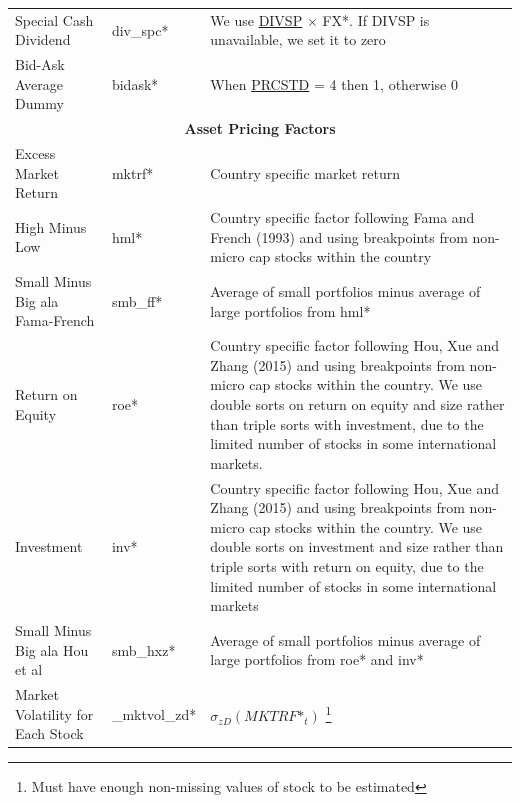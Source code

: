 \documentclass[12pt,title,fleqn]{article}
\begin{document}
{\begin{longtable}{@{\extracolsep{\fill}}|m{5cm}|l|m{8cm}|@{}}
    Special Cash Dividend & div\_spc\mbox{*} & We use 
    \href{https://wrds-www.wharton.upenn.edu/data-dictionary/form_metadata/comp_na_daily_all_secd_dataitems/DIVSP/}{DIVSP} $\times$ FX\mbox{*}. If DIVSP is unavailable, we set it to zero \\
    
    Bid-Ask Average Dummy & bidask\mbox{*} & When \href{https://wrds-www.wharton.upenn.edu/data-dictionary/form_metadata/comp_na_daily_all_secd_dataitems/PRCSTD/}{PRCSTD} = 4 then 1, otherwise 0 \\
    
	\hline 
	\multicolumn{3}{|c|}{\textbf{Asset Pricing Factors}} \\
	\hline 
	
	Excess Market Return & mktrf\mbox{*} & Country specific market return \\
		
	High Minus Low & hml\mbox{*} & Country specific factor following Fama and French (1993) and using breakpoints from non-micro cap stocks within the country \\
		
	Small Minus Big ala Fama-French & smb\_ff\mbox{*} & Average of small portfolios minus average of large portfolios from  hml\mbox{*} \\
		
	Return on Equity & roe\mbox{*} & Country specific factor following Hou, Xue and Zhang (2015) and using breakpoints from non-micro cap stocks within the country. We use double sorts on return on equity and size rather than triple sorts with investment, due to the limited number of stocks in some international markets. \\
		
	Investment & inv\mbox{*} & Country specific factor following Hou, Xue and Zhang (2015) and using breakpoints from non-micro cap stocks within the country. We use double sorts on investment and size rather than triple sorts with return on equity, due to the limited number of stocks in some international markets\\
	
	Small Minus Big ala Hou et al & smb\_hxz\mbox{*} & Average of small portfolios minus average of large portfolios from roe\mbox{*} and inv\mbox{*}\\
		
	Market Volatility for Each Stock & \_mktvol\_zd\mbox{*} & 
	    $\sigma_{zD}(MKTRF\mbox{*}_t)$ \footnote{Must have enough non-missing values of stock to be estimated} \\

\end{longtable}
}
\end{document}

